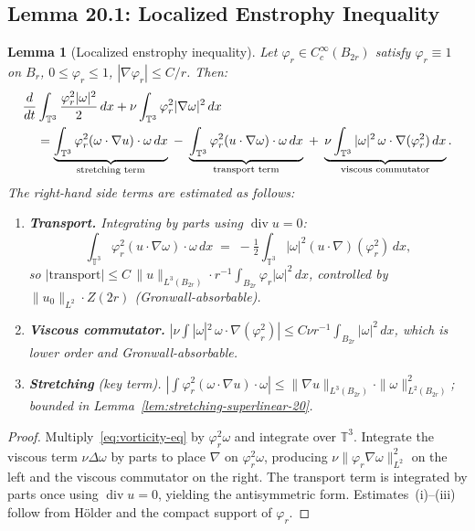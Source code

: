 \documentclass[11pt]{article}
\newtheorem{lemma}[theorem]{Lemma}
\theoremstyle{definition}
\theoremstyle{remark}
\newcommand{\T}{\mathbb{T}}
\newcommand{\divg}{\operatorname{div}}
\begin{document}
\subsection{Lemma 20.1: Localized Enstrophy Inequality}

\begin{lemma}[Localized enstrophy inequality]\label{lem:local-enstrophy-ineq-20}
  Let $\varphi_r\in C_c^\infty(B_{2r})$ satisfy $\varphi_r\equiv 1$ on $B_r$,
  $0\leq\varphi_r\leq 1$, $|\nabla\varphi_r|\leq C/r$.  Then:
  \begin{align}\label{eq:enstrophy-ineq-20}
    \frac{d}{dt}&\int_{\T^3}\frac{\varphi_r^2|\omega|^2}{2}\,dx
    + \nu\int_{\T^3}\varphi_r^2|\nabla\omega|^2\,dx \notag\\
    &= \underbrace{\int_{\T^3}\varphi_r^2(\omega\cdot\nabla u)\cdot\omega\,dx}
         _{\text{stretching term}}
     \;-\; \underbrace{\int_{\T^3}\varphi_r^2(u\cdot\nabla\omega)\cdot\omega\,dx}
         _{\text{transport term}}
     \;+\; \underbrace{\nu\int_{\T^3}|\omega|^2\,\omega\cdot\nabla(\varphi_r^2)\,dx}
         _{\text{viscous commutator}}.
  \end{align}
  The right-hand side terms are estimated as follows:
  \begin{enumerate}[label=(\roman*)]
    \item \textbf{Transport.}  Integrating by parts using $\divg u=0$:
    \[
      \int_{\T^3}\varphi_r^2(u\cdot\nabla\omega)\cdot\omega\,dx
      \;=\; -\tfrac{1}{2}\int_{\T^3}|\omega|^2(u\cdot\nabla)(\varphi_r^2)\,dx,
    \]
    so $|\text{transport}|\leq C\,\|u\|_{L^3(B_{2r})}\cdot r^{-1}
    \int_{B_{2r}}\varphi_r|\omega|^2\,dx$,
    controlled by $\|u_0\|_{L^2}\cdot Z(2r)$ (Gronwall-absorbable).

    \item \textbf{Viscous commutator.}
    $|\nu\int|\omega|^2\,\omega\cdot\nabla(\varphi_r^2)|\leq
    C\nu r^{-1}\int_{B_{2r}}|\omega|^2\,dx$,
    which is lower order and Gronwall-absorbable.

    \item \textbf{Stretching} (key term).
    $|\int\varphi_r^2(\omega\cdot\nabla u)\cdot\omega|\leq
    \|\nabla u\|_{L^3(B_{2r})}\cdot\|\omega\|_{L^2(B_{2r})}^2$;
    bounded in Lemma~\ref{lem:stretching-superlinear-20}.
  \end{enumerate}
\end{lemma}

\begin{proof}
  Multiply~\eqref{eq:vorticity-eq} by $\varphi_r^2\omega$ and integrate over
  $\T^3$.  Integrate the viscous term $\nu\Delta\omega$ by parts to place $\nabla$
  on $\varphi_r^2\omega$, producing $\nu\|\varphi_r\nabla\omega\|_{L^2}^2$
  on the left and the viscous commutator on the right.  The transport term is
  integrated by parts once using $\divg u=0$, yielding the antisymmetric form.
  Estimates~(i)--(iii) follow from Hölder and the compact support of $\varphi_r$.
\end{proof}
\end{document}
